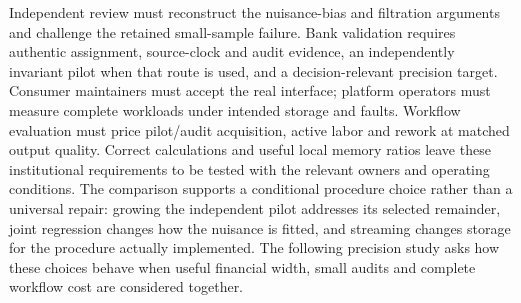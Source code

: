 Independent review must reconstruct the nuisance-bias and filtration arguments
and challenge the retained small-sample failure. Bank validation requires
authentic assignment, source-clock and audit evidence, an independently
invariant pilot when that route is used, and a decision-relevant precision
target. Consumer maintainers must accept the real interface; platform operators
must measure complete workloads under intended storage and faults. Workflow
evaluation must price pilot/audit acquisition, active labor and rework at matched
output quality. Correct calculations and useful local memory ratios leave
these institutional requirements to be tested with the relevant owners and
operating conditions. The comparison supports a conditional procedure choice rather than a universal repair: growing the independent pilot addresses its selected remainder, joint regression changes how the nuisance is fitted, and streaming changes storage for the procedure actually implemented. The following precision study asks how these choices behave when useful financial width, small audits and complete workflow cost are considered together.

